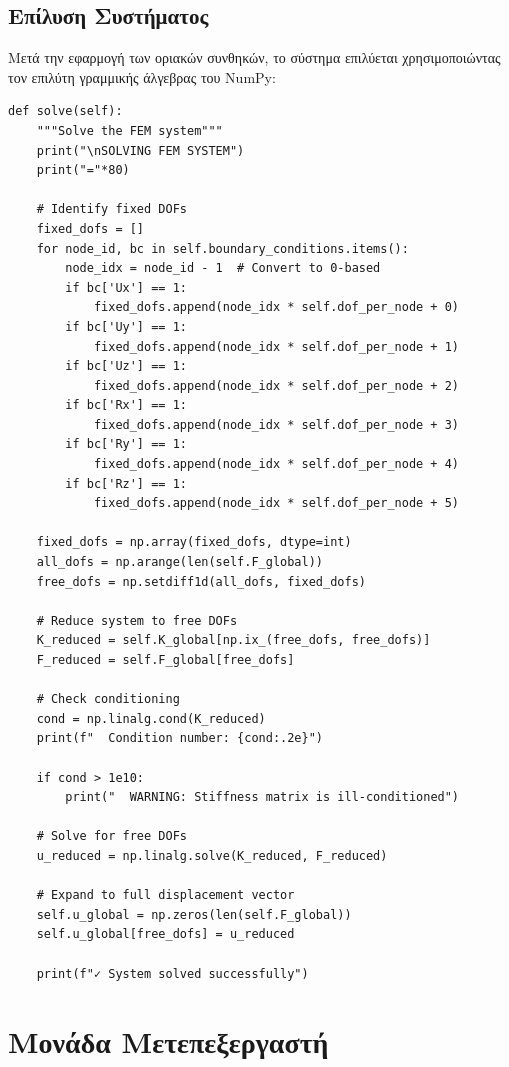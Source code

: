 \documentclass[12pt,a4paper]{article}
\begin{document}
\subsection{Επίλυση Συστήματος}

Μετά την εφαρμογή των οριακών συνθηκών, το σύστημα επιλύεται χρησιμοποιώντας τον επιλύτη γραμμικής άλγεβρας του NumPy:

\begin{lstlisting}[caption={Επίλυση Συστήματος}]
def solve(self):
    """Solve the FEM system"""
    print("\nSOLVING FEM SYSTEM")
    print("="*80)
    
    # Identify fixed DOFs
    fixed_dofs = []
    for node_id, bc in self.boundary_conditions.items():
        node_idx = node_id - 1  # Convert to 0-based
        if bc['Ux'] == 1:
            fixed_dofs.append(node_idx * self.dof_per_node + 0)
        if bc['Uy'] == 1:
            fixed_dofs.append(node_idx * self.dof_per_node + 1)
        if bc['Uz'] == 1:
            fixed_dofs.append(node_idx * self.dof_per_node + 2)
        if bc['Rx'] == 1:
            fixed_dofs.append(node_idx * self.dof_per_node + 3)
        if bc['Ry'] == 1:
            fixed_dofs.append(node_idx * self.dof_per_node + 4)
        if bc['Rz'] == 1:
            fixed_dofs.append(node_idx * self.dof_per_node + 5)
    
    fixed_dofs = np.array(fixed_dofs, dtype=int)
    all_dofs = np.arange(len(self.F_global))
    free_dofs = np.setdiff1d(all_dofs, fixed_dofs)
    
    # Reduce system to free DOFs
    K_reduced = self.K_global[np.ix_(free_dofs, free_dofs)]
    F_reduced = self.F_global[free_dofs]
    
    # Check conditioning
    cond = np.linalg.cond(K_reduced)
    print(f"  Condition number: {cond:.2e}")
    
    if cond > 1e10:
        print("  WARNING: Stiffness matrix is ill-conditioned")
    
    # Solve for free DOFs
    u_reduced = np.linalg.solve(K_reduced, F_reduced)
    
    # Expand to full displacement vector
    self.u_global = np.zeros(len(self.F_global))
    self.u_global[free_dofs] = u_reduced
    
    print(f"✓ System solved successfully")
\end{lstlisting}

\section{Μονάδα Μετεπεξεργαστή}
\end{document}
